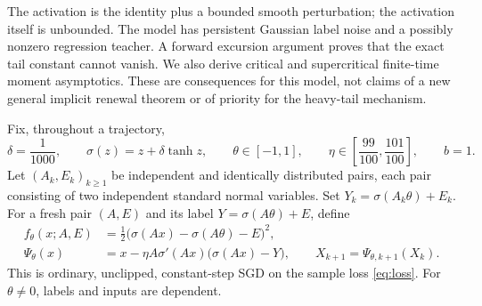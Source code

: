 \documentclass[11pt,a4paper]{article}
\numberwithin{equation}{section}
\theoremstyle{remark}
\begin{document}
The activation is the identity plus a bounded smooth perturbation; the
activation itself is unbounded. The model has persistent Gaussian label
noise and a possibly nonzero regression teacher. A forward excursion
argument proves that the exact tail constant cannot vanish. We also
derive critical and supercritical finite-time moment asymptotics. These
are consequences for this model, not claims of a new general implicit
renewal theorem or of priority for the heavy-tail mechanism.

Fix, throughout a trajectory,
\begin{equation}
\delta=\frac1{1000},\qquad \sigma(z)=z+\delta\tanh z,\qquad
\theta\in[-1,1],\qquad \eta\in\left[\frac{99}{100},\frac{101}{100}\right],
\qquad b=1.\label{eq:model-parameters}
\end{equation}
Let $(A_k,E_k)_{k\geq1}$ be independent and identically distributed pairs,
each pair consisting of two independent standard normal variables. Set
$Y_k=\sigma(A_k\theta)+E_k$. For a fresh pair $(A,E)$ and its label
$Y=\sigma(A\theta)+E$, define
\begin{align}
 f_\theta(x;A,E)&=\frac12\bigl(\sigma(Ax)-\sigma(A\theta)-E\bigr)^2,
 \label{eq:loss}\\
 \Psi_\theta(x)&=x-\eta A\sigma'(Ax)\bigl(\sigma(Ax)-Y\bigr),
 \qquad X_{k+1}=\Psi_{\theta,k+1}(X_k).\label{eq:update}
\end{align}
This is ordinary, unclipped, constant-step SGD on the sample loss
\eqref{eq:loss}. For $\theta\ne0$, labels and inputs are dependent.
\end{document}
